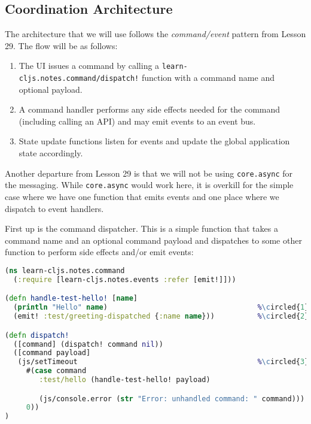 \documentclass[10pt,twoside,openright]{memoir}
\newcommand*\circled[1]{\tikz[baseline=(char.base)]{
            \node[shape=circle,draw,inner sep=1pt] (char) {#1};}}
\begin{document}
\subsection{Coordination Architecture}

The architecture that we will use follows the \emph{command/event}
pattern from Lesson 29. The flow will be as follows:

\begin{enumerate}
\def\labelenumi{\arabic{enumi}.}
\tightlist
\item
  The UI issues a command by calling a
  \texttt{learn-cljs.notes.command/dispatch!} function with a command
  name and optional payload.
\item
  A command handler performs any side effects needed for the command
  (including calling an API) and may emit events to an event bus.
\item
  State update functions listen for events and update the global
  application state accordingly.
\end{enumerate}

Another departure from Lesson 29 is that we will not be using
\texttt{core.async} for the messaging. While \texttt{core.async} would
work here, it is overkill for the simple case where we have one function
that emits events and one place where we dispatch to event handlers.

First up is the command dispatcher. This is a simple function that takes
a command name and an optional command payload and dispatches to some
other function to perform side effects and/or emit events:

\begin{lstlisting}[language=Clojure, caption={notes/command.cljs}]
(ns learn-cljs.notes.command
  (:require [learn-cljs.notes.events :refer [emit!]]))

(defn handle-test-hello! [name]
  (println "Hello" name)                                   %\circled{1}%
  (emit! :test/greeting-dispatched {:name name}))          %\circled{2}%

(defn dispatch!
  ([command] (dispatch! command nil))
  ([command payload]
   (js/setTimeout                                          %\circled{3}%
     #(case command
        :test/hello (handle-test-hello! payload)

        (js/console.error (str "Error: unhandled command: " command)))
     0))
)
\end{lstlisting}
\end{document}
